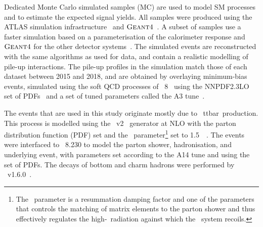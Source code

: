\documentclass[letterpaper,12pt]{article}
\begin{document}



Dedicated Monte Carlo  simulated samples (MC)  are used to model SM
processes and to estimate the expected signal yields.  All samples were 
produced using the ATLAS simulation infrastructure~\cite{SOFT-2010-01}
and $\textsc{Geant}4$~\cite{Agostinelli:2002hh}. A subset of samples use a faster 
simulation based on a parameterisation of the calorimeter response and 
$\textsc{Geant}4$ for the other detector systems~\cite{SOFT-2010-01}. %
The simulated events are reconstructed with the same algorithms as
used for data, and contain a realistic modelling of pile-up
interactions. The pile-up profiles in the simulation match those of each dataset
between 2015 and 2018, and are obtained by overlaying minimum-bias events,
simulated using the soft QCD processes of
{\PYTHIA}~8~\cite{Sjostrand:2014zea} using the NNPDF2.3LO set of
PDFs~\cite{Ball:2012cx} and a set of tuned
parameters called the A3 tune~\cite{ATL-PHYS-PUB-2016-017}.

The events that are used in this study originate mostly due to \
ttbar\ production. This process is modelled using the
\powhegbox~v2~\cite{Frixione:2007nw,Nason:2004rx,Frixione:2007vw,Alioli:2010xd}
generator at NLO with the \nnpdfnlo %
parton distribution function (PDF) set
and the \hdamp\ parameter\footnote{The
  \hdamp\ parameter is a resummation damping factor and one of the
  parameters that controls the matching of \powheg matrix elements to
  the parton shower and thus effectively regulates the
  high-\pt\ radiation against which the \ttbar\ system recoils.} set
to 1.5~\mtop~\cite{ATL-PHYS-PUB-2016-020}.  The events were interfaced
to {\PYTHIA}~8.230 to model the parton shower,
hadronisation, and underlying event, with parameters set according
to the A14 tune and using the \nnpdftwo set of PDFs.
The decays of bottom and charm hadrons were performed by \evtgen~v1.6.0~\cite{EvtGen}.
\end{document}
